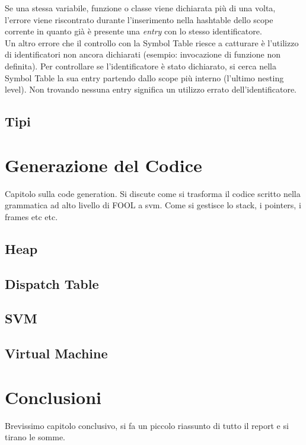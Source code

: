 \documentclass{scrreprt}
\begin{document}
Se una stessa variabile, funzione o classe viene dichiarata più di una volta, l'errore viene riscontrato durante l'inserimento
nella hashtable dello scope corrente in quanto già è presente una \textit{entry} con lo stesso identificatore. \\

Un altro errore che il controllo con la Symbol Table riesce a catturare è l'utilizzo di identificatori non ancora dichiarati (esempio: invocazione di funzione non definita). 
Per controllare se l'identificatore è stato dichiarato, si cerca nella Symbol Table la sua entry partendo dallo scope più interno (l'ultimo nesting level). Non trovando nessuna entry
significa un utilizzo errato dell'identificatore.

\section{Tipi}

\chapter{Generazione del Codice}
Capitolo sulla code generation. Si discute come si trasforma il codice scritto nella grammatica
ad alto livello di FOOL a svm. Come si gestisce lo stack, i pointers, i frames etc etc.
\section{Heap}
\section{Dispatch Table}
\section{SVM}
\section{Virtual Machine}

\chapter{Conclusioni}
Brevissimo capitolo conclusivo, si fa un piccolo riassunto di tutto il report e si tirano le somme.
\end{document}
